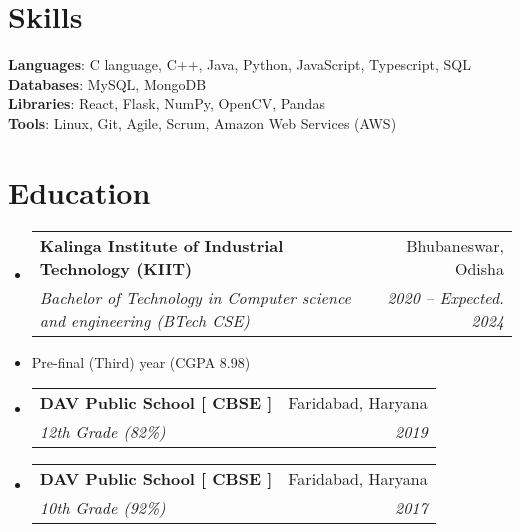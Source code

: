 \documentclass[letterpaper,11pt]{article}
\makeatletter
\newcommand{\resumeItem}[1]{
  \item\small{
    {#1 \vspace{-2pt}}
  }
}
\newcommand{\resumeSubheading}[4]{
  \vspace{-2pt}\item
    \begin{tabular*}{0.97\textwidth}[t]{l@{\extracolsep{\fill}}r}
      \textbf{#1} & #2 \\
      \textit{\small#3} & \textit{\small #4} \\
    \end{tabular*}\vspace{-7pt}
}
\newcommand{\resumeSubHeadingListStart}{\begin{itemize}[leftmargin=0.15in, label={}]}
\newcommand{\resumeSubHeadingListEnd}{\end{itemize}}
\makeatother
\begin{document}
%
\section{Skills}
 \begin{itemize}[leftmargin=0.15in, label={}]
    \small{\item{
      \textbf{Languages}{: C language, C++, Java, Python, JavaScript, Typescript, SQL } \\
      \textbf{Databases}{: MySQL, MongoDB } \\
      \textbf{Libraries}{: React, Flask, NumPy, OpenCV, Pandas} \\
     \textbf{Tools}{: Linux, Git, Agile, Scrum, Amazon Web Services (AWS)} \\
    }}
 \end{itemize}
 
\section{Education}
  \resumeSubHeadingListStart
    \resumeSubheading
      {Kalinga Institute of Industrial Technology (KIIT)}{Bhubaneswar, Odisha}
      {Bachelor of Technology in Computer science and engineering (BTech CSE)}{2020 -- Expected. 2024}
      \resumeItem{Pre-final (Third) year (CGPA 8.98)}

    \resumeSubheading
      {DAV Public School [ CBSE ]}{Faridabad, Haryana}
      {12th Grade (82\%)}{2019}

    \resumeSubheading
      {DAV Public School [ CBSE ]}{Faridabad, Haryana}
      {10th Grade (92\%)}{2017}
  \resumeSubHeadingListEnd
\end{document}
